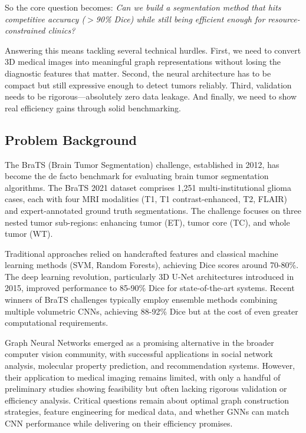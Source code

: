So the core question becomes: \textit{Can we build a segmentation method that hits competitive accuracy ($>$90\% Dice) while still being efficient enough for resource-constrained clinics?}

Answering this means tackling several technical hurdles. First, we need to convert 3D medical images into meaningful graph representations without losing the diagnostic features that matter. Second, the neural architecture has to be compact but still expressive enough to detect tumors reliably. Third, validation needs to be rigorous—absolutely zero data leakage. And finally, we need to show real efficiency gains through solid benchmarking.

\subsection{Problem Background}

The BraTS (Brain Tumor Segmentation) challenge, established in 2012, has become the de facto benchmark for evaluating brain tumor segmentation algorithms. The BraTS 2021 dataset comprises 1,251 multi-institutional glioma cases, each with four MRI modalities (T1, T1 contrast-enhanced, T2, FLAIR) and expert-annotated ground truth segmentations. The challenge focuses on three nested tumor sub-regions: enhancing tumor (ET), tumor core (TC), and whole tumor (WT).

Traditional approaches relied on handcrafted features and classical machine learning methods (SVM, Random Forests), achieving Dice scores around 70-80\%. The deep learning revolution, particularly 3D U-Net architectures introduced in 2015, improved performance to 85-90\% Dice for state-of-the-art systems. Recent winners of BraTS challenges typically employ ensemble methods combining multiple volumetric CNNs, achieving 88-92\% Dice but at the cost of even greater computational requirements.

Graph Neural Networks emerged as a promising alternative in the broader computer vision community, with successful applications in social network analysis, molecular property prediction, and recommendation systems. However, their application to medical imaging remains limited, with only a handful of preliminary studies showing feasibility but often lacking rigorous validation or efficiency analysis. Critical questions remain about optimal graph construction strategies, feature engineering for medical data, and whether GNNs can match CNN performance while delivering on their efficiency promises.


